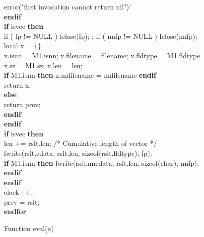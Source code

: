 \begin{figure}
{\begin{minipage}{20cm}
\begin{tabbing}
      error("first invocation cannot return nil")' \- \\
    {\bf endif} \\
    {\bf if} isvec {\bf then} \+ \\ 
      if ( fp != NULL ) { fclose(fp); }; if ( nnfp != NULL ) { fclose(nnfp); } \\
      local x = \{\} \\
      x.isnn = M1.isnn; x.filename = filename; x.fldtype = M1.fldtype \\
      x.sz = M1.sz; x.len = len; \\
      {\bf if } M1.isnn {\bf then} x.nnfilename = nnfilename {\bf endif} \\
      return x; \- \\
    {\bf else}  \+ \\ 
      return prev; \- \\
    {\bf endif} \- \\
  {\bf endif} \\
  {\bf if} isvec {\bf then} \+ \\
    len += rslt.len; /* Cumulative length of vector */ \\
    fwrite(rslt.cdata, rslt.len, sizeof(rslt.fldtype), fp); \\
{\bf if} M1.isnn {\bf then} fwrite(rslt.nncdata, rslt.len, sizeof(char), nnfp); {\bf endif} \- \\
  {\bf endif} \\ 
  clock++; \\
  prev = rslt; \- \\
{\bf endfor}
\end{tabbing}
\end{minipage}
}
\label{eval}
\caption{Function eval(x)}
\end{figure}

